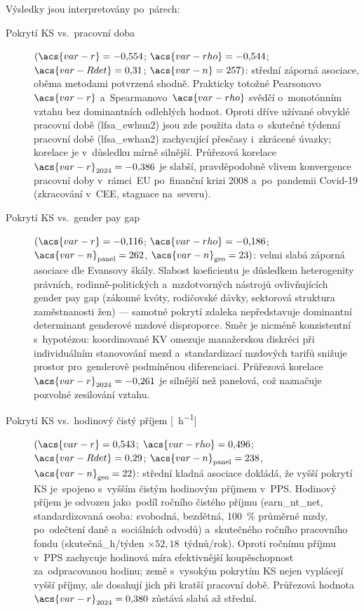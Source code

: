 Výsledky jsou interpretovány po~párech:

\begin{description}
  \item[Pokrytí \acs{KS} vs.\ pracovní doba] $(\acs{var-r}=-0{,}554$;
    $\acs{var-rho}=-0{,}544$; $\acs{var-Rdet}=0{,}31$; $\acs{var-n}=257)$:
    střední záporná asociace, oběma metodami potvrzená shodně. Prakticky
    totožné Pearsonovo~$\acs{var-r}$ a~Spearmanovo~$\acs{var-rho}$ svědčí
    o~monotónním vztahu bez dominantních odlehlých hodnot. Oproti dříve užívané
    obvyklé pracovní době (lfsa\_ewhun2) jsou zde použita data o~skutečné
    týdenní pracovní době (lfsa\_ewhan2) zachycující přesčasy i~zkrácené
    úvazky; korelace je v~důsledku mírně silnější. Průřezová korelace
    $\acs{var-r}_{2024} = -0{,}386$ je slabší, pravděpodobně vlivem
    konvergence pracovní doby v~rámci~\acs{EU} po~finanční krizi 2008
    a~po~pandemii Covid-19 (zkracování v~CEE, stagnace na~severu).

  \item[Pokrytí \acs{KS} vs.\ gender pay gap] $(\acs{var-r}=-0{,}116$;
    $\acs{var-rho}=-0{,}186$; $\acs{var-n}_{\text{panel}}=262$,
    $\acs{var-n}_{\text{geo}}=23)$: velmi slabá záporná asociace dle Evansovy
    škály. Slabost koeficientu je důsledkem heterogenity právních,
    rodinně-politických a~mzdotvorných nástrojů ovlivňujících gender pay gap (zákonné kvóty, rodičovské
    dávky, sektorová struktura zaměstnanosti žen) --- samotné pokrytí
     zdaleka nepředstavuje dominantní determinant genderové mzdové
    disproporce. Směr je nicméně konzistentní s~hypotézou: koordinované
    \acs{KV} omezuje manažerskou diskréci při individuálním stanovování mezd
    a~standardizací mzdových tarifů snižuje prostor pro~genderově podmíněnou
    diferenciaci. Průřezová korelace $\acs{var-r}_{2024} = -0{,}261$ je silnější
    než panelová, což naznačuje pozvolné zesilování vztahu.

  \item[Pokrytí \acs{KS} vs.\ hodinový čistý příjem
    {[\si{\pps\per\hour}]}]
    $(\acs{var-r}=0{,}543$; $\acs{var-rho}=0{,}496$;
    $\acs{var-Rdet}=0{,}29$; $\acs{var-n}_{\text{panel}}=238$,
    $\acs{var-n}_{\text{geo}}=22)$: střední kladná asociace dokládá, že
    vyšší pokrytí \acs{KS} je~spojeno s~vyšším čistým hodinovým příjmem
    v~\acs{PPS}. Hodinový příjem je odvozen jako~podíl ročního čistého
    příjmu (earn\_nt\_net, standardizovaná osoba: svobodná, bezdětná,
    \SI{100}{\percent} průměrné mzdy, po~odečtení daně a~sociálních odvodů)
    a~skutečného ročního pracovního fondu
    (skutečná\_h/týden $\times 52{,}18$~týdnů/rok). Oproti ročnímu příjmu
    v~\acs{PPS} zachycuje hodinová míra efektivnější koupěschopnost za~odpracovanou hodinu;
    země s~vysokým pokrytím \acs{KS} nejen vyplácejí vyšší příjmy, ale dosahují
    jich při kratší pracovní době. Průřezová hodnota $\acs{var-r}_{2024}=0{,}380$
    zůstává slabá až střední.


\end{description}
